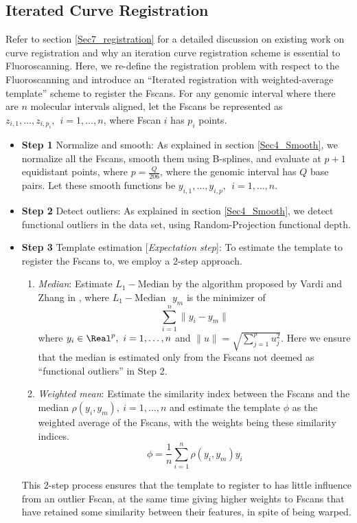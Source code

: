 \subsection{Iterated Curve Registration} \label{Sec4_Registration}
Refer to section \ref{Sec7_registration} for a detailed discussion on existing work on curve registration and why an iteration curve registration scheme is essential to Fluoroscanning. Here, we re-define the registration problem with respect to the Fluoroscanning and introduce an ``Iterated registration with weighted-average template'' scheme to register the Fscans.
For any genomic interval where there are $n$ molecular intervals aligned, let the Fscans be represented as $z_{i,1}, \dots, z_{i, p_i},\ \ i = 1,\dots, n$, where Fscan $i$ has $p_i$ points. 
\begin{itemize}
\item {\bf{Step 1}} Normalize and smooth: As explained in section \ref{Sec4_Smooth}, we normalize all the Fscans, smooth them using B-splines, and evaluate at $p + 1$ equidistant points, where $p = \frac{Q}{206}$, where the genomic interval has $Q$ base pairs. Let these smooth functions be $y_{i,1}, \dots, y_{i,p},\ \ i = 1,\dots,n$. 
\item {\bf{Step 2}} Detect outliers: As explained in section \ref{Sec4_Smooth}, we detect functional outliers in the data set, using Random-Projection functional depth. 
\item {\bf{Step 3}} Template estimation [{\emph{Expectation step}}]: To estimate the template to register the Fscans to, we employ a 2-step approach. 
\begin{enumerate}
\item {\emph{Median}}: Estimate $L_1-\text{Median}$ by the algorithm proposed by Vardi and Zhang in \cite{Vardi_Zhang_2000_PNAS}, where $L_1-\text{Median }$ $y_m$ is the minimizer of 
\[ \sum\limits_{i = 1}^n \|y_i - y_m \| \]
where $y_i \in \Real^p, \ i = 1,\dots,n$ and $\|u \| = \sqrt{\sum\limits_{j = 1}^p u_j^2}$. Here we ensure that the median is estimated only from the Fscans not deemed as ``functional outliers'' in Step 2. 
\item {\emph{Weighted mean}}: Estimate the similarity index between the Fscans and the median $\rho(y_i, y_m), \ i = 1,\dots,n$ and estimate the template $\phi$ as the weighted average of the Fscans, with the weights being these similarity indices. 
\[ \phi = \frac{1}{n}\sum\limits_{i = 1}^n \rho(y_i, y_m) y_i \]
\end{enumerate}
This 2-step process ensures that the template to register to has little influence from an outlier Fscan, at the same time giving higher weights to Fscans that have retained some similarity between their features, in spite of being warped. 

\end{itemize}
